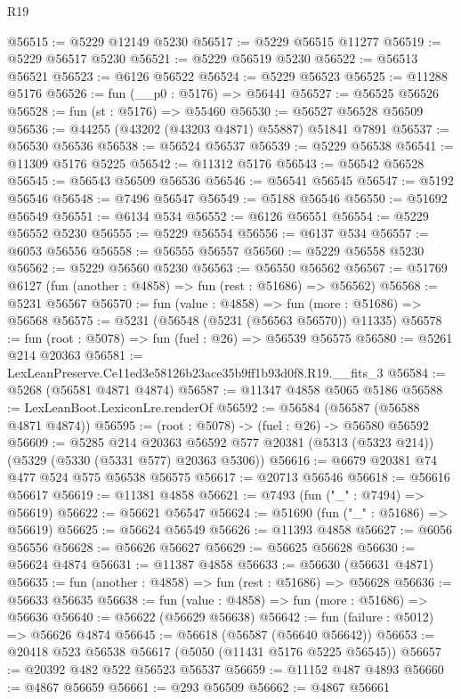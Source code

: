 \begin{lexlean}{R19}
\begin{coremodule}
@56515 := @5229 @12149 @5230
@56517 := @5229 @56515 @11277
@56519 := @5229 @56517 @5230
@56521 := @5229 @56519 @5230
@56522 := @56513 @56521
@56523 := @6126 @56522
@56524 := @5229 @56523
@56525 := @11288 @5176
@56526 := fun (__p0 : @5176) => @56441
@56527 := @56525 @56526
@56528 := fun (st : @5176) => @55460
@56530 := @56527 @56528 @56509
@56536 := @44255 (@43202 (@43203 @4871) @55887) @51841 @7891
@56537 := @56530 @56536
@56538 := @56524 @56537
@56539 := @5229 @56538
@56541 := @11309 @5176 @5225
@56542 := @11312 @5176
@56543 := @56542 @56528
@56545 := @56543 @56509 @56536
@56546 := @56541 @56545
@56547 := @5192 @56546
@56548 := @7496 @56547
@56549 := @5188 @56546
@56550 := @51692 @56549
@56551 := @6134 @534
@56552 := @6126 @56551
@56554 := @5229 @56552 @5230
@56555 := @5229 @56554
@56556 := @6137 @534
@56557 := @6053 @56556
@56558 := @56555 @56557
@56560 := @5229 @56558 @5230
@56562 := @5229 @56560 @5230
@56563 := @56550 @56562
@56567 := @51769 @6127 (fun (another : @4858) => fun (rest : @51686) => @56562)
@56568 := @5231 @56567
@56570 := fun (value : @4858) => fun (more : @51686) => @56568
@56575 := @5231 (@56548 (@5231 (@56563 @56570)) @11335)
@56578 := fun (root : @5078) => fun (fuel : @26) => @56539 @56575
@56580 := @5261 @214 @20363
@56581 := LexLeanPreserve.Ce11ed3e58126b23ace35b9ff1b93d0f8.R19.__fits_3
@56584 := @5268 (@56581 @4871 @4874)
@56587 := @11347 @4858 @5065 @5186
@56588 := LexLeanBoot.LexiconLre.renderOf
@56592 := @56584 (@56587 (@56588 @4871 @4874))
@56595 := (root : @5078) -> (fuel : @26) -> @56580 @56592
@56609 := @5285
    @214
    @20363
    @56592
    @577
    @20381
    (@5313 (@5323 @214))
    (@5329 (@5330 (@5331 @577) @20363 @5306))
@56616 := @6679 @20381 @74 @477 @524 @575 @56538 @56575
@56617 := @20713 @56546
@56618 := @56616 @56617
@56619 := @11381 @4858
@56621 := @7493 (fun ("_" : @7494) => @56619)
@56622 := @56621 @56547
@56624 := @51690 (fun ("_" : @51686) => @56619)
@56625 := @56624 @56549
@56626 := @11393 @4858
@56627 := @6056 @56556
@56628 := @56626 @56627
@56629 := @56625 @56628
@56630 := @56624 @4874
@56631 := @11387 @4858
@56633 := @56630 (@56631 @4871)
@56635 := fun (another : @4858) => fun (rest : @51686) => @56628
@56636 := @56633 @56635
@56638 := fun (value : @4858) => fun (more : @51686) => @56636
@56640 := @56622 (@56629 @56638)
@56642 := fun (failure : @5012) => @56626 @4874
@56645 := @56618 (@56587 (@56640 @56642))
@56653 := @20418 @523 @56538 @56617 (@5050 (@11431 @5176 @5225 @56545))
@56657 := @20392 @482 @522 @56523 @56537
@56659 := @11152 @487 @4893
@56660 := @4867 @56659
@56661 := @293 @56509
@56662 := @4867 @56661

\end{coremodule}
\end{lexlean}
